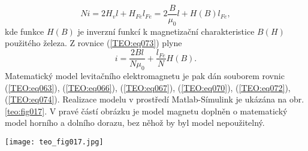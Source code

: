{      \begin{equation}\label{TEO:eq073}
      Ni = 2H_vl+H_{Fe}l_{Fe} = 2\frac{B}{\mu_0}l + H(B)l_{Fe},
      \end{equation}
      kde funkce \(H(B)\) je inverzní funkcí k magnetizační charakteristice \(B(H)\) použitého 
      železa. Z rovnice (\ref{TEO:eq073}) plyne
      \begin{equation}\label{TEO:eq074}
        i = \frac{2Bl}{N\mu_0} + \frac{l_{Fe}}{N}H(B).
      \end{equation}
      Matematický model levitačního elektromagnetu je pak dán souborem rovnic (\ref{TEO:eq063}), 
      (\ref{TEO:eq066}), (\ref{TEO:eq067}), (\ref{TEO:eq070}), (\ref{TEO:eq072}), 
      (\ref{TEO:eq074}). Realizace modelu v prostředí Matlab-Símulink je ukázána na obr. 
      \ref{teo:fig017}. V pravé částí obrázku je model magnetu doplněn o matematický model horního 
      a dolního dorazu, bez něhož by byl model nepoužitelný.
      
      \begin{figure*}[ht!] %
        \centering
        \texttt{[image: teo\_fig017.jpg]}
        \caption{Matematický model levitačního elektromagnetu v prostředí Matlab-Simulink.
                 (\cite[s.~168]{Patocka4})}
        \label{teo:fig017}
      \end{figure*}

} %
\printbibliography[title={Seznam literatury}, heading=subbibliography]
